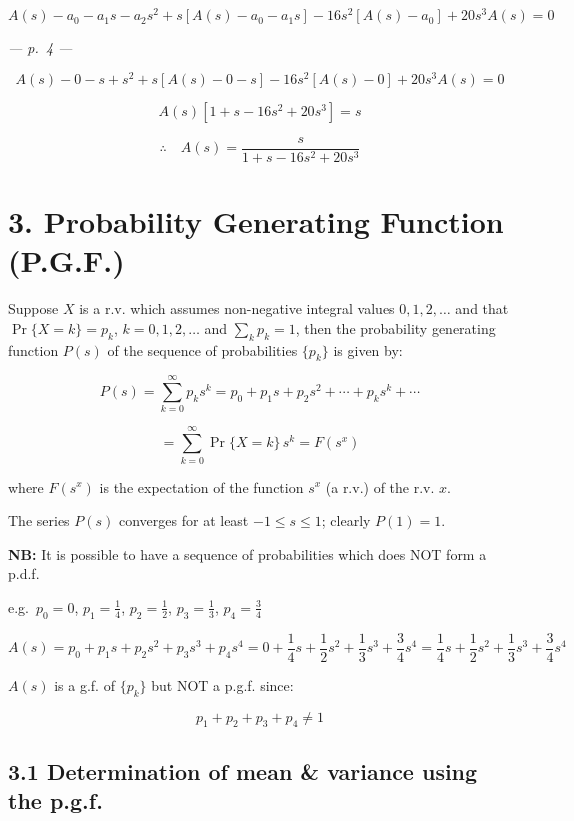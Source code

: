 \documentclass[
]{article}
\begin{document}
\[A(s) - a_0 - a_1 s - a_2 s^2 + s\left[A(s) - a_0 - a_1 s\right] - 16 s^2 \left[A(s) - a_0\right] + 20 s^3 A(s) = 0\]

\emph{--- p.~4 ---}

\[A(s) - 0 - s + s^2 + s\left[A(s) - 0 - s\right] - 16 s^2 \left[A(s) - 0\right] + 20 s^3 A(s) = 0\]

\[A(s) \left[1 + s - 16 s^2 + 20 s^3\right] = s\]

\[\therefore \quad A(s) = \frac{s}{1 + s - 16 s^2 + 20 s^3}\]

\section{3. Probability Generating Function
(P.G.F.)}\label{probability-generating-function-p.g.f.}

Suppose \(X\) is a r.v. which assumes non-negative integral values
\(0, 1, 2, \ldots\) and that \(\Pr\{X = k\} = p_k\),
\(k = 0, 1, 2, \ldots\) and \(\sum_k p_k = 1\), then the probability
generating function \(P(s)\) of the sequence of probabilities
\(\{p_k\}\) is given by:

\[P(s) = \sum_{k=0}^{\infty} p_k s^k = p_0 + p_1 s + p_2 s^2 + \cdots + p_k s^k + \cdots\]

\[= \sum_{k=0}^{\infty} \Pr\{X = k\}\, s^k = F(s^x)\]

where \(F(s^x)\) is the expectation of the function \(s^x\) (a r.v.) of
the r.v. \(x\).

The series \(P(s)\) converges for at least \(-1 \le s \le 1\); clearly
\(P(1) = 1\).

\textbf{NB:} It is possible to have a sequence of probabilities which
does NOT form a p.d.f.

e.g.~\(p_0 = 0\), \(p_1 = \frac{1}{4}\), \(p_2 = \frac{1}{2}\),
\(p_3 = \frac{1}{3}\), \(p_4 = \frac{3}{4}\)

\[A(s) = p_0 + p_1 s + p_2 s^2 + p_3 s^3 + p_4 s^4 = 0 + \frac{1}{4}s + \frac{1}{2}s^2 + \frac{1}{3}s^3 + \frac{3}{4}s^4 = \frac{1}{4}s + \frac{1}{2}s^2 + \frac{1}{3}s^3 + \frac{3}{4}s^4\]

\(A(s)\) is a g.f. of \(\{p_k\}\) but NOT a p.g.f. since:

\[p_1 + p_2 + p_3 + p_4 \ne 1\]

\subsection{3.1 Determination of mean \& variance using the
p.g.f.}\label{determination-of-mean-variance-using-the-p.g.f.}
\end{document}
